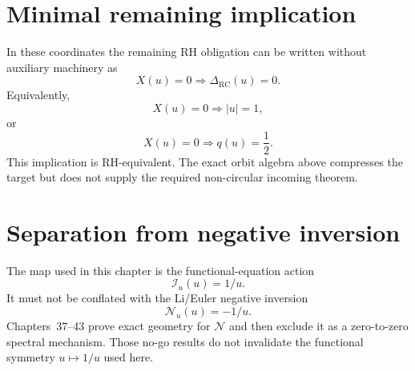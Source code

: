 \section{Minimal remaining implication}
In these coordinates the remaining RH obligation can be written without auxiliary machinery as
\[
\boxed{
X(u)=0\Longrightarrow\Delta_{\mathrm{RC}}(u)=0.
}
\]
Equivalently,
\[
X(u)=0\Longrightarrow |u|=1,
\]
or
\[
X(u)=0\Longrightarrow q(u)=\frac12.
\]
This implication is RH-equivalent. The exact orbit algebra above compresses the target but does not supply the required non-circular incoming theorem.

\section{Separation from negative inversion}
The map used in this chapter is the functional-equation action
\[
\mathcal I_u(u)=1/u.
\]
It must not be conflated with the Li/Euler negative inversion
\[
\mathcal N_u(u)=-1/u.
\]
Chapters~37--43 prove exact geometry for $\mathcal N$ and then exclude it as a zero-to-zero spectral mechanism. Those no-go results do not invalidate the functional symmetry $u\mapsto1/u$ used here.


